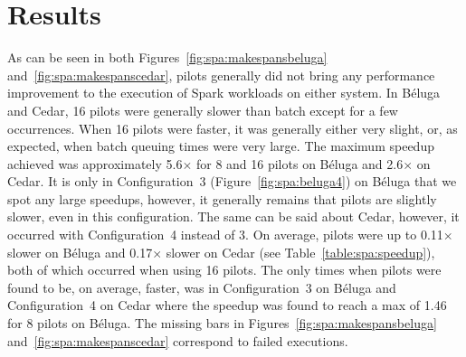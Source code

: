     
    
    \section{Results}\label{spa:sec:results}
    
    As can be seen in both Figures~\ref{fig:spa:makespansbeluga}
    and~\ref{fig:spa:makespanscedar}, pilots generally did not bring any
    performance improvement to the execution of Spark workloads on either
    system. In B\'eluga and Cedar, 16 pilots were generally slower than batch
    except for a few occurrences. When 16 pilots were faster, it was generally
    either very slight, or, as expected, when batch queuing times were very
    large. The maximum speedup achieved was approximately 5.6$\times$ for 8 and
    16 pilots on B\'eluga and 2.6$\times$ on Cedar. It is only in
    Configuration~3 (Figure~\ref{fig:spa:beluga4}) on B\'eluga that we spot any
    large speedups, however, it generally remains that pilots are slightly
    slower, even in this configuration. The same can be said about Cedar,
    however, it occurred with Configuration~4 instead of 3. On average, pilots
    were up to 0.11$\times$ slower on B\'eluga and 0.17$\times$ slower on Cedar
    (see Table~\ref{table:spa:speedup}), both of which occurred when using 16
    pilots. The only times when pilots were found to be, on average, faster, was
    in Configuration~3 on B\'eluga and Configuration~4 on Cedar where the
    speedup was found to reach a max of 1.46 for 8 pilots on B\'eluga. The
    missing bars in Figures~\ref{fig:spa:makespansbeluga}
    and~\ref{fig:spa:makespanscedar} correspond to failed executions.
    
